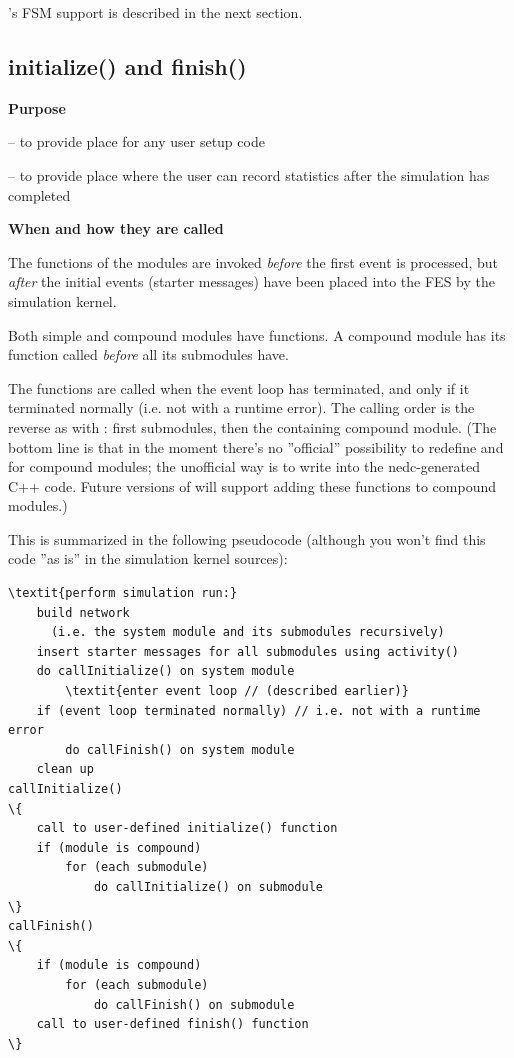 {\opp}'s FSM support is described in the next section.



\subsection{initialize() and finish()}

\textbf{Purpose}


 -- to provide place for any user setup code

 -- to provide place where the user can record statistics
after the simulation has completed


\textbf{When and how they are called}


The  functions of the modules are invoked
\textit{before} the first event is processed, but \textit{after} the
initial events (starter messages) have been
placed into the FES by the simulation kernel.


Both simple and compound modules have  functions.
A compound module has its  function called
\textit{before} all its submodules have.


The  functions are called when the event
loop has terminated, and only if it terminated
normally (i.e. not with a runtime error).  The calling order is the
reverse as with : first submodules, then the
containing compound module. (The bottom line is that in the moment
there's no ''official'' possibility to redefine 
and  for compound modules; the unofficial way is to
write into the nedc-generated C++ code. Future versions of {\opp} will
support adding these functions to compound
modules.)

This is summarized in the following pseudocode (although you
won't find this code ''as is'' in the simulation
kernel sources):


\begin{Verbatim}[commandchars=\\\{\}]
\textit{perform simulation run:}
    build network
      (i.e. the system module and its submodules recursively)
    insert starter messages for all submodules using activity()
    do callInitialize() on system module
        \textit{enter event loop // (described earlier)}
    if (event loop terminated normally) // i.e. not with a runtime
error
        do callFinish() on system module
    clean up
callInitialize()
\{
    call to user-defined initialize() function
    if (module is compound)
        for (each submodule)
            do callInitialize() on submodule
\}
callFinish()
\{
    if (module is compound)
        for (each submodule)
            do callFinish() on submodule
    call to user-defined finish() function
\}
\end{Verbatim}



